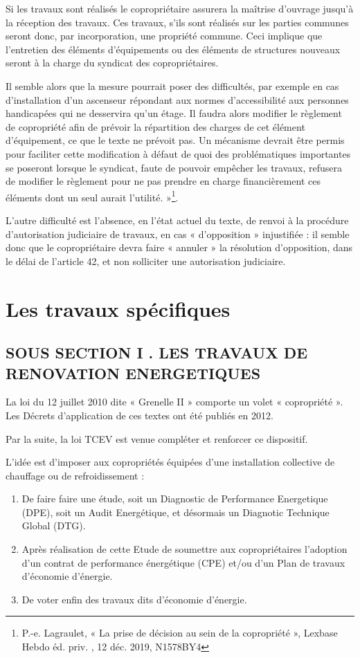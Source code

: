			Si les travaux sont réalisés le copropriétaire assurera la maîtrise d’ouvrage jusqu’à la réception des travaux. Ces travaux, s’ils sont réalisés sur les parties communes seront donc, par incorporation, une propriété commune. Ceci implique que l’entretien des éléments d’équipements ou des éléments de structures nouveaux seront à la charge du syndicat des copropriétaires.
			
			Il semble alors que la mesure pourrait poser des difficultés, par exemple en cas d’installation d’un ascenseur répondant aux normes d’accessibilité aux personnes handicapées qui ne desservira qu’un étage. Il faudra alors modifier le règlement de copropriété afin de prévoir la répartition des charges de cet élément d’équipement, ce que le texte ne prévoit pas. Un mécanisme devrait être permis pour faciliter cette modification à défaut de quoi des problématiques importantes se poseront lorsque le syndicat, faute de pouvoir empêcher les travaux, refusera de modifier le règlement pour ne pas prendre en charge financièrement ces éléments dont un seul aurait l’utilité. »\footnote{P.-e. Lagraulet, « La prise de décision au sein de la copropriété », Lexbase Hebdo éd. priv. , 12 déc. 2019, N1578BY4}.
			
			L’autre difficulté est l’absence, en l’état actuel du texte, de renvoi à la procédure d’autorisation judiciaire de travaux, en cas « d’opposition » injustifiée : il semble donc que le copropriétaire devra faire « annuler » la résolution d’opposition, dans le délai de l’article 42, et non solliciter une autorisation judiciaire.
	
\section{Les travaux spécifiques}

	\subsection{SOUS SECTION I . LES TRAVAUX DE RENOVATION ENERGETIQUES}
	
	La loi du 12 juillet 2010 dite « Grenelle II » comporte un volet « copropriété ». Les Décrets d’application de ces textes ont été publiés en 2012.
	
	Par la suite, la loi TCEV est venue compléter et renforcer ce dispositif.
	
	L’idée est d’imposer aux copropriétés équipées d’une installation collective de chauffage ou de refroidissement :
	\begin{enumerate}
		\item De faire faire une étude, soit un Diagnostic de Performance Energetique (DPE), soit un Audit Energétique, et désormais un Diagnotic Technique Global (DTG).
		
		\item Après réalisation de cette Etude de soumettre aux copropriétaires l’adoption d’un contrat de performance énergétique (CPE) et/ou d’un Plan de travaux d’économie d’énergie.
		
		\item De voter enfin des travaux dits d’économie d’énergie.
	\end{enumerate}
	
